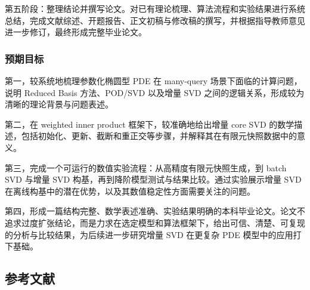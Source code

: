 第五阶段：整理结论并撰写论文。对已有理论梳理、算法流程和实验结果进行系统总结，完成文献综述、开题报告、正文初稿与修改稿的撰写，并根据指导教师意见进一步修订，最终形成完整毕业论文。

\subsubsection{预期目标}

第一，较系统地梳理参数化椭圆型 PDE 在 many-query 场景下面临的计算问题，说明 Reduced Basis 方法、POD/SVD 以及增量 SVD 之间的逻辑关系，形成较为清晰的理论背景与问题表述。

第二，在 weighted inner product 框架下，较准确地给出增量 core SVD 的数学描述，包括初始化、更新、截断和重正交等步骤，并解释其在有限元快照数据中的意义。

第三，完成一个可运行的数值实验流程：从高精度有限元快照生成，到 batch SVD 与增量 SVD 构基，再到降阶模型测试与结果比较。通过实验展示增量 SVD 在离线构基中的潜在优势，以及其数值稳定性方面需要关注的问题。

第四，形成一篇结构完整、数学表述准确、实验结果明确的本科毕业论文。论文不追求过度扩张结论，而是力求在选定模型和算法框架下，给出可信、清楚、可复现的分析与比较结果，为后续进一步研究增量 SVD 在更复杂 PDE 模型中的应用打下基础。


{
\newpage

\subsection{参考文献}
{\normalfont{}\setlength{\baselineskip}{14pt}
\renewcommand{\refname}{\vspace{-\baselineskip}}
}
}